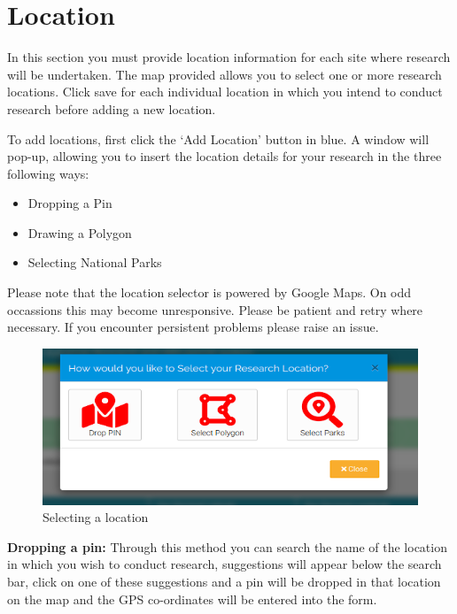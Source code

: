 \documentclass[
]{book}
\providecommand{\tightlist}{%
  \setlength{\itemsep}{0pt}\setlength{\parskip}{0pt}}
\begin{document}
\hypertarget{location}{%
\chapter{Location}\label{location}}

In this section you must provide location information for each site where research will be undertaken. The map provided allows you to select one or more research locations. Click save for each individual location in which you intend to conduct research before adding a new location.

To add locations, first click the `Add Location' button in blue. A window will pop-up, allowing you to insert the location details for your research in the three following ways:

\begin{itemize}
\tightlist
\item
  Dropping a Pin
\item
  Drawing a Polygon
\item
  Selecting National Parks
\end{itemize}

Please note that the location selector is powered by Google Maps. On odd occassions this may become unresponsive. Please be patient and retry where necessary. If you encounter persistent problems please raise an issue.

\begin{figure}
\centering
\includegraphics{images/Screenshot 2021-03-01 at 13.43.17.png}
\caption{Selecting a location}
\end{figure}

\textbf{Dropping a pin:} Through this method you can search the name of the location in which you wish to conduct research, suggestions will appear below the search bar, click on one of these suggestions and a pin will be dropped in that location on the map and the GPS co-ordinates will be entered into the form.
\end{document}
